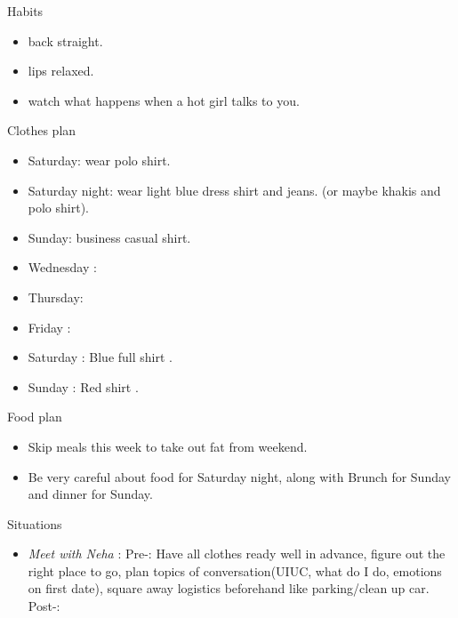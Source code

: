 \documentclass[serif, mathserif, final]{beamer}
\begin{document}
\begin{frame}{}
\begin{columns}
\begin{column}{0.25\linewidth}
  \begin{block}{ Habits } 
    \begin{itemize} 
    \tiny \item \tiny back straight. 
    \item \tiny lips relaxed. 
    \item \tiny watch what happens when a hot girl talks to you. 
    \end{itemize} 
  \end{block} 

  \begin{block}{ Clothes plan } 
    \begin{itemize} 
    \tiny \item \tiny Saturday: wear polo shirt. 
    \item \tiny Saturday night: wear light blue dress shirt and jeans. (or maybe khakis and polo shirt). 
    \item \tiny Sunday: business casual shirt. 
    \item \tiny Wednesday : 
    \item \tiny Thursday: 
    \item \tiny Friday : 
    \item \tiny Saturday : Blue full shirt . 
    \item \tiny Sunday : Red shirt .
    \end{itemize} 
  \end{block} 
  \begin{block}{ Food plan } 
    \begin{itemize} 
      \tiny \item \tiny Skip meals this week to take out fat from weekend. 
    \item \tiny Be very careful about food for Saturday night, along with Brunch for Sunday and dinner for Sunday. 
    \end{itemize} 
  \end{block} 
  \begin{block}{ Situations} 
    \begin{itemize} 
      
    \item \tiny \textit{Meet with Neha }: Pre-: Have all clothes ready well in
      advance, figure out the right place to go, plan topics of
      conversation(UIUC, what do I do, emotions on first date), square
      away logistics beforehand like parking/clean up car.  Post-:   
      

\end{itemize}
\end{block}
\end{column}
\end{columns}
\end{frame}
\end{document}
